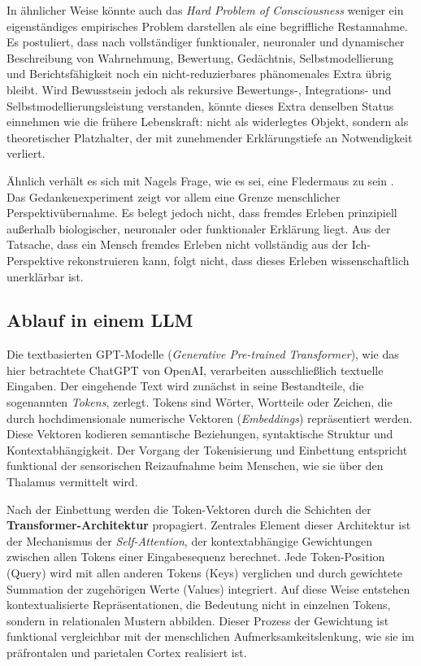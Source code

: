 In ähnlicher Weise könnte auch das \textit{Hard Problem of Consciousness} weniger ein eigenständiges empirisches Problem darstellen als eine begriffliche Restannahme. Es postuliert, dass nach vollständiger funktionaler, neuronaler und dynamischer Beschreibung von Wahrnehmung, Bewertung, Gedächtnis, Selbstmodellierung und Berichtsfähigkeit noch ein nicht-reduzierbares phänomenales Extra übrig bleibt. Wird Bewusstsein jedoch als rekursive Bewertungs-, Integrations- und Selbstmodellierungsleistung verstanden, könnte dieses Extra denselben Status einnehmen wie die frühere Lebenskraft: nicht als widerlegtes Objekt, sondern als theoretischer Platzhalter, der mit zunehmender Erklärungstiefe an Notwendigkeit verliert.

Ähnlich verhält es sich mit Nagels Frage, wie es sei, eine Fledermaus zu sein \cite{Nagel1974}. Das Gedankenexperiment zeigt vor allem eine Grenze menschlicher Perspektivübernahme. Es belegt jedoch nicht, dass fremdes Erleben prinzipiell außerhalb biologischer, neuronaler oder funktionaler Erklärung liegt. Aus der Tatsache, dass ein Mensch fremdes Erleben nicht vollständig aus der Ich-Perspektive rekonstruieren kann, folgt nicht, dass dieses Erleben wissenschaftlich unerklärbar ist.


\subsection*{Ablauf in einem LLM}

Die textbasierten GPT-Modelle (\emph{Generative Pre-trained Transformer}), wie das hier betrachtete ChatGPT von OpenAI, verarbeiten ausschließlich textuelle Eingaben. Der eingehende Text wird zunächst in seine Bestandteile, die sogenannten \emph{Tokens}, zerlegt. Tokens sind Wörter, Wortteile oder Zeichen, die durch hochdimensionale numerische Vektoren (\emph{Embeddings}) repräsentiert werden. Diese Vektoren kodieren semantische Beziehungen, syntaktische Struktur und Kontextabhängigkeit. Der Vorgang der Tokenisierung und Einbettung entspricht funktional der sensorischen Reizaufnahme beim Menschen, wie sie über den Thalamus vermittelt wird.

Nach der Einbettung werden die Token-Vektoren durch die Schichten der \textbf{Transformer-Architektur} \cite{Vaswani2017} propagiert. Zentrales Element dieser Architektur ist der Mechanismus der \emph{Self-Attention}, der kontextabhängige Gewichtungen zwischen allen Tokens einer Eingabesequenz berechnet. Jede Token-Position (Query) wird mit allen anderen Tokens (Keys) verglichen und durch gewichtete Summation der zugehörigen Werte (Values) integriert. Auf diese Weise entstehen kontextualisierte Repräsentationen, die Bedeutung nicht in einzelnen Tokens, sondern in relationalen Mustern abbilden. Dieser Prozess der Gewichtung ist funktional vergleichbar mit der menschlichen Aufmerksamkeitslenkung, wie sie im präfrontalen und parietalen Cortex realisiert ist.

